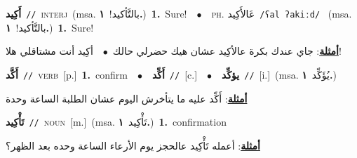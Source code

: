 \documentclass[10pt,a4paper,twoside]{article} %
\begin{document}
\begin{multicols}{2}
{\setlength\topsep{0pt}\textbf{\foreignlanguage{arabic}{أَكِيد}}\ {\color{gray}\texttt{//}\color{black}}\ \textsc{interj}\ \color{gray}(msa. \foreignlanguage{arabic}{بالتَّأكيد!}~\foreignlanguage{arabic}{\textbf{١.}})\color{black}\ \textbf{1.}~Sure!\ \ $\bullet$\ \ \textsc{ph.} \color{gray} \foreignlanguage{arabic}{عَالأَكِيد}\color{black}\ {\color{gray}\texttt{/{\sffamily ʕal ʔakiːd}/}\color{black}}\ \color{gray} (msa. \foreignlanguage{arabic}{بالتَّأكيد!}~\foreignlanguage{arabic}{\textbf{١.}})\color{black}\ \textbf{1.}~Sure!\  \begin{flushright}\color{gray}\foreignlanguage{arabic}{\textbf{\underline{\foreignlanguage{arabic}{أمثلة}}}: جاي عندك بكرة عالأكِيد عشان هيك حضرلي حالك\ $\bullet$\ \  أكِيد أنت مشتاقلي هلا!}\end{flushright}\color{black}} \vspace{2mm}

{\setlength\topsep{0pt}\textbf{\foreignlanguage{arabic}{أَكَّد}}\ {\color{gray}\texttt{//}\color{black}}\ \textsc{verb}\ [p.]\ \textbf{1.}~confirm\ \ $\bullet$\ \ \setlength\topsep{0pt}\textbf{\foreignlanguage{arabic}{أَكِّد}}\ {\color{gray}\texttt{//}\color{black}}\ [c.]\ \ $\bullet$\ \ \setlength\topsep{0pt}\textbf{\foreignlanguage{arabic}{يؤكِّد}}\ {\color{gray}\texttt{//}\color{black}}\ [i.]\ \color{gray}(msa. \foreignlanguage{arabic}{يُؤَكِّد}~\foreignlanguage{arabic}{\textbf{١.}})\color{black}\  \begin{flushright}\color{gray}\foreignlanguage{arabic}{\textbf{\underline{\foreignlanguage{arabic}{أمثلة}}}: أَكِّد عليه ما يتأخرش اليوم عشان الطلبة الساعة وحدة}\end{flushright}\color{black}} \vspace{2mm}

{\setlength\topsep{0pt}\textbf{\foreignlanguage{arabic}{تَأْكِيد}}\ {\color{gray}\texttt{//}\color{black}}\ \textsc{noun}\ [m.]\ \color{gray}(msa. \foreignlanguage{arabic}{تَأْكِيد}~\foreignlanguage{arabic}{\textbf{١.}})\color{black}\ \textbf{1.}~confirmation\  \begin{flushright}\color{gray}\foreignlanguage{arabic}{\textbf{\underline{\foreignlanguage{arabic}{أمثلة}}}: أعمله تَأْكِيد عالحجز يوم الأرعاء الساعة وحده بعد الظهر؟}\end{flushright}\color{black}} \vspace{2mm}


\end{multicols}
\end{document}
